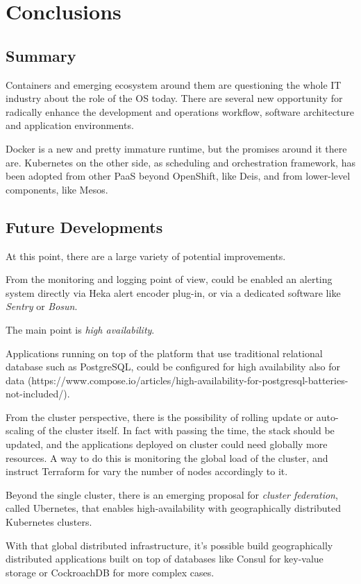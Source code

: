 \chapter{Conclusions}\label{conclusions}

\section{Summary}\label{summary}

Containers and emerging ecosystem around them are questioning the whole
IT industry about the role of the OS today. There are several new
opportunity for radically enhance the development and operations
workflow, software architecture and application environments.

Docker is a new and pretty immature runtime, but the promises around it
there are. Kubernetes on the other side, as scheduling and orchestration
framework, has been adopted from other PaaS beyond OpenShift, like Deis,
and from lower-level components, like Mesos.

\section{Future Developments}\label{future-developments}

At this point, there are a large variety of potential improvements.

From the monitoring and logging point of view, could be enabled an
alerting system directly via Heka alert encoder plug-in, or via a
dedicated software like \emph{Sentry} or \emph{Bosun}.

The main point is \emph{high availability}\cite{HighAvailability}.

Applications running on top of the platform that use traditional
relational database such as PostgreSQL, could be configured for high
availability also for data
(https://www.compose.io/articles/high-availability-for-postgresql-batteries-not-included/).

From the cluster perspective, there is the possibility of rolling update
or auto-scaling of the cluster itself. In fact with passing the time,
the stack should be updated, and the applications deployed on cluster
could need globally more resources. A way to do this is monitoring the
global load of the cluster, and instruct Terraform for vary the number
of nodes accordingly to it.

Beyond the single cluster, there is an emerging proposal for
\emph{cluster federation}, called Ubernetes, that enables
high-availability with geographically distributed Kubernetes clusters.

With that global distributed infrastructure, it's possible build
geographically distributed applications built on top of databases like
Consul for key-value storage or CockroachDB for more complex cases.